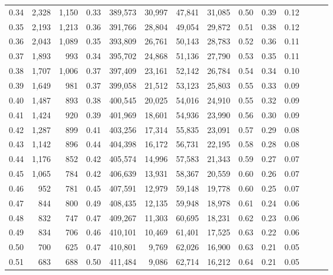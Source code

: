 \begin{tabular}{rrrrrrrrrrrrrr}
0.34 &   2,328 &  1,150 &  0.33 &  389,573 &   30,997 &  47,841 &  31,085 &  0.50 &  0.39 &      0.12 \\
0.35 &   2,193 &  1,213 &  0.36 &  391,766 &   28,804 &  49,054 &  29,872 &  0.51 &  0.38 &      0.12 \\
0.36 &   2,043 &  1,089 &  0.35 &  393,809 &   26,761 &  50,143 &  28,783 &  0.52 &  0.36 &      0.11 \\
0.37 &   1,893 &    993 &  0.34 &  395,702 &   24,868 &  51,136 &  27,790 &  0.53 &  0.35 &      0.11 \\
0.38 &   1,707 &  1,006 &  0.37 &  397,409 &   23,161 &  52,142 &  26,784 &  0.54 &  0.34 &      0.10 \\
0.39 &   1,649 &    981 &  0.37 &  399,058 &   21,512 &  53,123 &  25,803 &  0.55 &  0.33 &      0.09 \\
0.40 &   1,487 &    893 &  0.38 &  400,545 &   20,025 &  54,016 &  24,910 &  0.55 &  0.32 &      0.09 \\
0.41 &   1,424 &    920 &  0.39 &  401,969 &   18,601 &  54,936 &  23,990 &  0.56 &  0.30 &      0.09 \\
0.42 &   1,287 &    899 &  0.41 &  403,256 &   17,314 &  55,835 &  23,091 &  0.57 &  0.29 &      0.08 \\
0.43 &   1,142 &    896 &  0.44 &  404,398 &   16,172 &  56,731 &  22,195 &  0.58 &  0.28 &      0.08 \\
0.44 &   1,176 &    852 &  0.42 &  405,574 &   14,996 &  57,583 &  21,343 &  0.59 &  0.27 &      0.07 \\
0.45 &   1,065 &    784 &  0.42 &  406,639 &   13,931 &  58,367 &  20,559 &  0.60 &  0.26 &      0.07 \\
0.46 &     952 &    781 &  0.45 &  407,591 &   12,979 &  59,148 &  19,778 &  0.60 &  0.25 &      0.07 \\
0.47 &     844 &    800 &  0.49 &  408,435 &   12,135 &  59,948 &  18,978 &  0.61 &  0.24 &      0.06 \\
0.48 &     832 &    747 &  0.47 &  409,267 &   11,303 &  60,695 &  18,231 &  0.62 &  0.23 &      0.06 \\
0.49 &     834 &    706 &  0.46 &  410,101 &   10,469 &  61,401 &  17,525 &  0.63 &  0.22 &      0.06 \\
0.50 &     700 &    625 &  0.47 &  410,801 &    9,769 &  62,026 &  16,900 &  0.63 &  0.21 &      0.05 \\
0.51 &     683 &    688 &  0.50 &  411,484 &    9,086 &  62,714 &  16,212 &  0.64 &  0.21 &      0.05 \\

\end{tabular}

